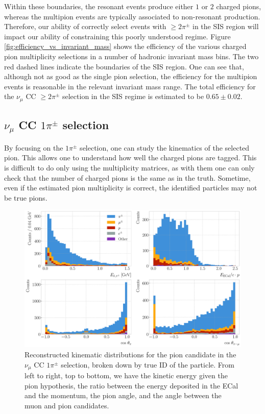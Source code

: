 Within these boundaries, the resonant events produce either $1$ or $2$ charged pions, whereas the multipion events are typically associated to non-resonant production. Therefore, our ability of correctly select events with $\geq 2\pi^{\pm}$ in the SIS region will impact our ability of constraining this poorly understood regime. Figure \ref{fig:efficiency_vs_invariant_mass} shows the efficiency of the various charged pion multiplicity selections in a number of hadronic invariant mass bins. The two red dashed lines indicate the boundaries of the SIS region. One can see that, although not as good as the single pion selection, the efficiency for the multipion events is reasonable in the relevant invariant mass range. The total efficiency for the $\nu_{\mu}$ CC $\geq 2\pi^{\pm}$ selection in the SIS regime is estimated to be $0.65 \pm 0.02$.

\subsection[\texorpdfstring{$\nu_{\mu}$}{numu} CC \texorpdfstring{$1\pi^{\pm}$}{1pi} selection]{\boldmath\texorpdfstring{$\nu_{\mu}$}{numu} CC \boldmath\texorpdfstring{$1\pi^{\pm}$}{1pi} selection}

By focusing on the $1\pi^{\pm}$ selection, one can study the kinematics of the selected pion. This allows one to understand how well the charged pions are tagged. This is difficult to do only using the multiplicity matrices, as with them one can only check that the number of charged pions is the same as in the truth. Sometime, even if the estimated pion multiplicity is correct, the identified particles may not be true pions.

\begin{figure}[t]
    \centering
    \includegraphics[width=.99\linewidth]{Images/GAr_selection/pion_selection_1pion_kinematics.pdf}
    \caption[Reconstructed kinematic distributions for the pion candidate in the $\nu_{\mu}$ CC $1\pi^{\pm}$ selection.]{Reconstructed kinematic distributions for the pion candidate in the $\nu_{\mu}$ CC $1\pi^{\pm}$ selection, broken down by true ID of the particle. From left to right, top to bottom, we have the kinetic energy given the pion hypothesis, the ratio between the energy deposited in the ECal and the momentum, the pion angle, and the angle between the muon and pion candidates.}
    \label{fig:1pion_kinematics}
\end{figure}

